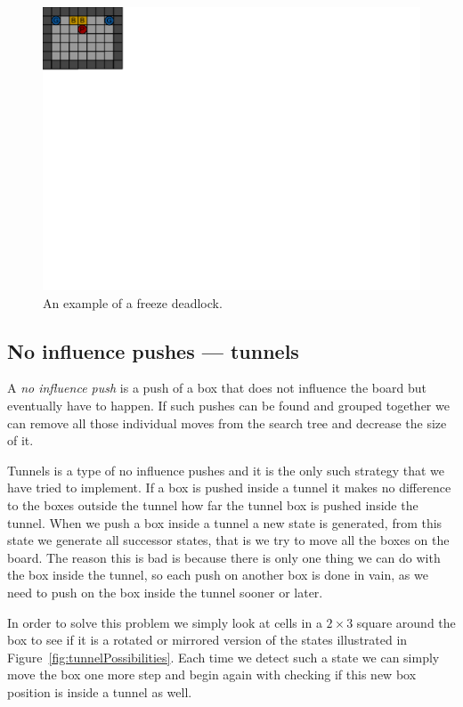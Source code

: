 \documentclass[a4paper,11pt]{article}
\renewcommand{\*}[0]{\cdot}
\begin{document}
\begin{figure}[h!]
    \begin{center}
        \includegraphics{figures/freezeDeadlock}
    \end{center}
    \caption{An example of a freeze deadlock.}
    \label{fig:freezeDeadlock}
\end{figure}


\subsection{No influence pushes --- tunnels}

A \emph{no influence push} is a push of a box that does not influence the board
but eventually have to happen. If such pushes can be found and grouped together
we can remove all those individual moves from the search tree and decrease the
size of it.

Tunnels is a type of no influence pushes and it is the only such strategy that
we have tried to implement. If a box is pushed inside a tunnel it makes no
difference to the boxes outside the tunnel how far the tunnel box is pushed
inside the tunnel. When we push a box inside a tunnel a new state is generated,
from this state we generate all successor states, that is we try to move all
the boxes on the board. The reason this is bad is because there is only one
thing we can do with the box inside the tunnel, so each push on another box is
done in vain, as we need to push on the box inside the tunnel sooner or  later.

In order to solve this problem we simply look at cells in a $2 \times 3$ square
around the box to see if it is a rotated or mirrored version of the states
illustrated in Figure~\ref{fig:tunnelPossibilities}. Each time we detect such a
state we can simply move the box one more step and begin again with checking if
this new box position is inside a tunnel as well.
\end{document}
